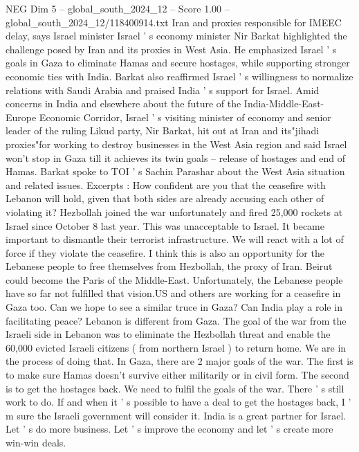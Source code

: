 \begin{textsample}{NEG Dim 5 – global\_south\_2024\_12 – Score 1.00 – global\_south\_2024\_12/118400914.txt}  \label{ex:f5_neg_408}
Iran and proxies responsible for IMEEC delay, says Israel minister Israel ' s economy minister Nir Barkat highlighted the challenge posed by Iran and its proxies in West Asia.
He emphasized Israel ' s goals in Gaza to eliminate Hamas and secure hostages, while supporting stronger economic ties with India.
Barkat also reaffirmed Israel ' s willingness to normalize relations with Saudi Arabia and praised India ' s support for Israel.
Amid concerns in India and elsewhere about the future of the India-Middle-East-Europe Economic Corridor, Israel ' s visiting minister of economy and senior leader of the ruling Likud party, Nir Barkat, hit out at Iran and its"jihadi proxies"for working to destroy businesses in the West Asia region and said Israel won't stop in Gaza till it achieves its twin goals -- release of hostages and end of Hamas.
Barkat spoke to TOI ' s Sachin Parashar about the West Asia situation and related issues.
Excerpts : How confident are you that the ceasefire with Lebanon will hold, given that both sides are already accusing each other of violating it?
Hezbollah joined the war unfortunately and fired 25,000 rockets at Israel since October 8 last year.
This was unacceptable to Israel.
It became important to dismantle their terrorist infrastructure.
We will react with a lot of force if they violate the ceasefire.
I think this is also an opportunity for the Lebanese people to free themselves from Hezbollah, the proxy of Iran.
Beirut could become the Paris of the Middle-East.
Unfortunately, the Lebanese people have so far not fulfilled that vision.US and others are working for a ceasefire in Gaza too.
Can we hope to see a similar truce in Gaza?
Can India play a role in facilitating peace?
Lebanon is different from Gaza.
The goal of the war from the Israeli side in Lebanon was to eliminate the Hezbollah threat and enable the 60,000 evicted Israeli citizens ( from northern Israel ) to return home.
We are in the process of doing that.
In Gaza, there are 2 major goals of the war.
The first is to make sure Hamas doesn't survive either militarily or in civil form.
The second is to get the hostages back.
We need to fulfil the goals of the war.
There ' s still work to do.
If and when it ' s possible to have a deal to get the hostages back, I ' m sure the Israeli government will consider it.
India is a great partner for Israel.
Let ' s do more business.
Let ' s improve the economy and let ' s create more win-win deals.

\end{textsample}
